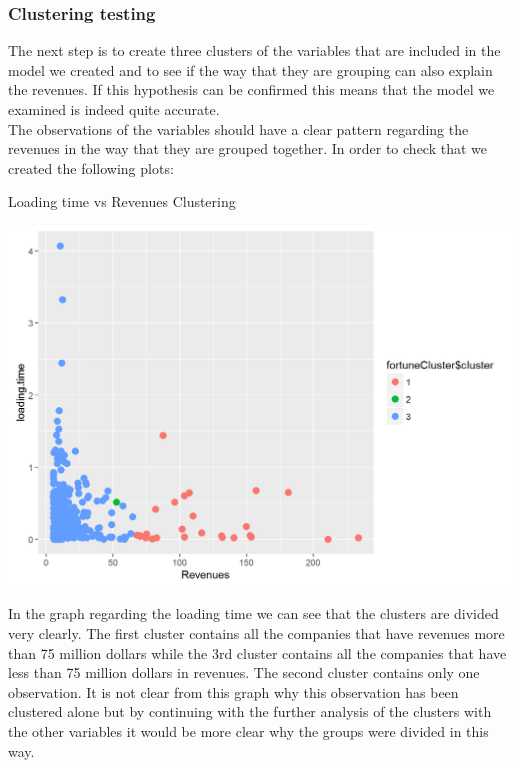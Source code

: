 \documentclass{book}
\begin{document}
\subsubsection{Clustering testing}
The next step is to create three clusters of the variables that are included in the model we created and to see if the way that they are grouping can also explain the revenues. If this hypothesis can be confirmed this means that the model we examined is indeed quite accurate.\\
The observations of the variables should have a clear pattern regarding the revenues in the way that they are grouped together. In order to check that we created the following plots:
\begin{table}[H]
\centering
\caption{Loading time vs Revenues Clustering}
\begin{center}
\includegraphics[scale=0.6]{../R/photos/91_clust_ld.png}   \\
\end{center}
\end{table}
In the graph regarding the loading time we can see that the clusters are divided very clearly. The first cluster contains all the companies that have revenues more than 75 million dollars while the 3rd cluster contains all the companies that have less than 75 million dollars in revenues. The second cluster contains only one observation. It is not clear from this graph why this observation has been clustered alone but by continuing with the further analysis of the clusters with the other variables it would be more clear why the groups were divided in this way.
\end{document}
